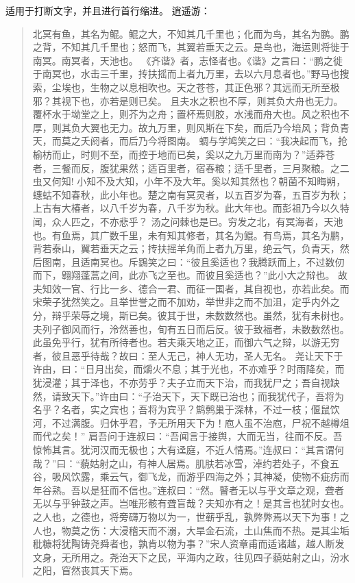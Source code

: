 \documentclass[utf8]{book}
\newcommand{\latexcommand}[1]{\fbox{\textbf{\textbackslash #1}}}
\begin{document}
		\latexcommand{quotation}适用于打断文字，并且进行首行缩进。
		逍遥游：
		\begin{quotation}
			北冥有鱼，其名为鲲。鲲之大，不知其几千里也；化而为鸟，其名为鹏。鹏之背，不知其几千里也；怒而飞，其翼若垂天之云。是鸟也，海运则将徙于南冥。南冥者，天池也。
			《齐谐》者，志怪者也。《谐》之言曰：“鹏之徙于南冥也，水击三千里，抟扶摇而上者九万里，去以六月息者也。”野马也搜索，尘埃也，生物之以息相吹也。天之苍苍，其正色邪？其远而无所至极邪？其视下也，亦若是则已矣。
			且夫水之积也不厚，则其负大舟也无力。覆杯水于坳堂之上，则芥为之舟；置杯焉则胶，水浅而舟大也。风之积也不厚，则其负大翼也无力。故九万里，则风斯在下矣，而后乃今培风；背负青天，而莫之夭阏者，而后乃今将图南。
			蜩与学鸠笑之曰：“我决起而飞，抢榆枋而止，时则不至，而控于地而已矣，奚以之九万里而南为？”适莽苍者，三餐而反，腹犹果然；适百里者，宿舂粮；适千里者，三月聚粮。之二虫又何知!
			小知不及大知，小年不及大年。奚以知其然也？朝菌不知晦朔，蟪蛄不知春秋，此小年也。楚之南有冥灵者，以五百岁为春，五百岁为秋；上古有大椿者，以八千岁为春，八千岁为秋。此大年也。而彭祖乃今以久特闻，众人匹之，不亦悲乎？
			汤之问棘也是已。穷发之北，有冥海者，天池也。有鱼焉，其广数千里，未有知其修者，其名为鲲。有鸟焉，其名为鹏，背若泰山，翼若垂天之云；抟扶摇羊角而上者九万里，绝云气，负青天，然后图南，且适南冥也。斥鷃笑之曰：“彼且奚适也？我腾跃而上，不过数仞而下，翱翔蓬蒿之间，此亦飞之至也。而彼且奚适也？”此小大之辩也。
			故夫知效一官、行比一乡、德合一君、而征一国者，其自视也，亦若此矣。而宋荣子犹然笑之。且举世誉之而不加劝，举世非之而不加沮，定乎内外之分，辩乎荣辱之境，斯已矣。彼其于世，未数数然也。虽然，犹有未树也。夫列子御风而行，泠然善也，旬有五日而后反。彼于致福者，未数数然也。此虽免乎行，犹有所待者也。若夫乘天地之正，而御六气之辩，以游无穷者，彼且恶乎待哉？故曰：至人无己，神人无功，圣人无名。
			尧让天下于许由，曰：“日月出矣，而爝火不息；其于光也，不亦难乎？时雨降矣，而犹浸灌；其于泽也，不亦劳乎？夫子立而天下治，而我犹尸之；吾自视缺然，请致天下。”许由曰：“子治天下，天下既已治也；而我犹代子，吾将为名乎？名者，实之宾也；吾将为宾乎？鹪鹩巢于深林，不过一枝；偃鼠饮河，不过满腹。归休乎君，予无所用天下为！庖人虽不治庖，尸祝不越樽俎而代之矣！”
			肩吾问于连叔曰：“吾闻言于接舆，大而无当，往而不反。吾惊怖其言。犹河汉而无极也；大有迳庭，不近人情焉。”连叔曰：“其言谓何哉？”曰：“藐姑射之山，有神人居焉。肌肤若冰雪，淖约若处子，不食五谷，吸风饮露，乘云气，御飞龙，而游乎四海之外；其神凝，使物不疵疠而年谷熟。吾以是狂而不信也。”连叔曰：“然。瞽者无以与乎文章之观，聋者无以与乎钟鼓之声。岂唯形骸有聋盲哉？夫知亦有之！是其言也犹时女也。之人也，之德也，将旁礴万物以为一，世蕲乎乱，孰弊弊焉以天下为事！之人也，物莫之伤：大浸稽天而不溺，大旱金石流，土山焦而不热。是其尘垢秕糠将犹陶铸尧舜者也，孰肯以物为事？”宋人资章甫而适诸越，越人断发文身，无所用之。尧治天下之民，平海内之政，往见四子藐姑射之山，汾水之阳，窅然丧其天下焉。

\end{quotation}
\end{document}
